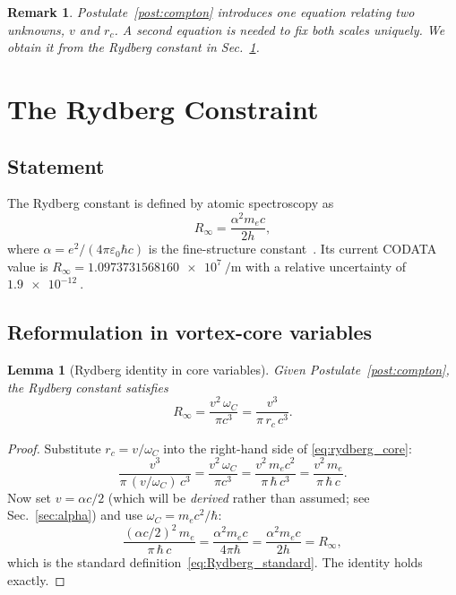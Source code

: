 \documentclass[aps,pra,preprint,longbibliography,nofootinbib]{revtex4-2}
\newtheorem{lemma}{Lemma}
\newtheorem{remark}{Remark}
\newcommand{\vc}{v}              %
\newcommand{\rc}{r_c}            %
\newcommand{\omC}{\omega_C}      %
\newcommand{\Rinf}{R_\infty}     %
\begin{document}
\begin{remark}
Postulate~\ref{post:compton} introduces one equation relating two
unknowns, $\vc$ and $\rc$.
A second equation is needed to fix both scales uniquely.
We obtain it from the Rydberg constant in Sec.~\ref{sec:rydberg}.
\end{remark}

\section{The Rydberg Constraint}
\label{sec:rydberg}

\subsection{Statement}

The Rydberg constant is defined by atomic spectroscopy as
\begin{equation}
  \Rinf = \frac{\alpha^2 m_e c}{2h},
  \label{eq:Rydberg_standard}
\end{equation}
where $\alpha = e^2/(4\pi\varepsilon_0\hbar c)$ is the fine-structure
constant~\cite{MohrTaylor2018}.
Its current CODATA value is
$\Rinf = \SI{1.0973731568160e7}{\per\meter}$ with a relative uncertainty
of $\SI{1.9e-12}{}$.

\subsection{Reformulation in vortex-core variables}

\begin{lemma}[Rydberg identity in core variables]
\label{lem:rydberg}
Given Postulate~\ref{post:compton}, the Rydberg constant satisfies
\begin{equation}
  \Rinf = \frac{\vc^2\,\omC}{\pi c^3}
         = \frac{\vc^3}{\pi\,\rc\,c^3}.
  \label{eq:rydberg_core}
\end{equation}
\end{lemma}

\begin{proof}
Substitute $\rc = \vc/\omC$ into the right-hand side of
\eqref{eq:rydberg_core}:
\begin{equation}
  \frac{\vc^3}{\pi\,(\vc/\omC)\,c^3}
  = \frac{\vc^2\,\omC}{\pi c^3}
  = \frac{\vc^2\,m_e c^2}{\pi\,\hbar\,c^3}
  = \frac{\vc^2\,m_e}{\pi\,\hbar\,c}.
  \label{eq:rydberg_proof_step}
\end{equation}
Now set $\vc = \alpha c/2$ (which will be \emph{derived} rather
than assumed; see Sec.~\ref{sec:alpha}) and use
$\omC = m_e c^2/\hbar$:
\begin{equation}
  \frac{(\alpha c/2)^2\,m_e}{\pi\,\hbar\,c}
  = \frac{\alpha^2 m_e c}{4\pi\hbar}
  = \frac{\alpha^2 m_e c}{2h}
  = \Rinf,
  \label{eq:rydberg_id_check}
\end{equation}
which is the standard definition~\eqref{eq:Rydberg_standard}.
The identity holds exactly.
\end{proof}
\end{document}

